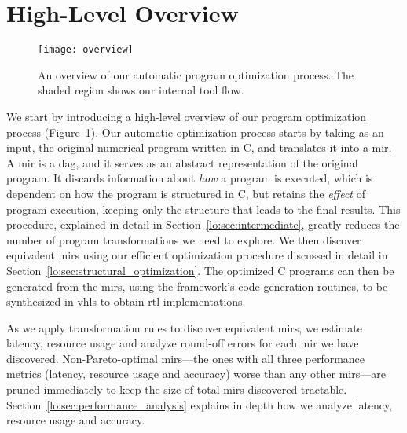 \section{High-Level Overview}
\label{lo:sec:overview}

\begin{figure}[ht]
    \centering
    \texttt{[image: overview]}
    \caption{%
        An overview of our automatic program optimization process. The shaded
        region shows our internal tool flow.
    }\label{lo:fig:overview}
\end{figure}

We start by introducing a high-level overview of our program optimization
process (Figure~\ref{lo:fig:overview}).  Our automatic optimization process
starts by taking as an input, the original numerical program written in C, and
translates it into a \gls{mir}\@.  A \gls{mir} is a \gls{dag}, and it serves as
an abstract representation of the original program.  It discards information
about \emph{how} a program is executed, which is dependent on how the program
is structured in C, but retains the \emph{effect} of program execution, keeping
only the structure that leads to the final results.  This procedure, explained
in detail in Section~\ref{lo:sec:intermediate}, greatly reduces the number
of program transformations we need to explore.  We then discover equivalent
\glspl{mir} using our efficient optimization procedure discussed in detail
in Section~\ref{lo:sec:structural_optimization}.  The optimized C programs
can then be generated from the \glspl{mir}, using the \soap{} framework's
code generation routines, to be synthesized in \gls{vhls} to obtain \gls{rtl}
implementations.

As we apply transformation rules to discover equivalent \glspl{mir}, we
estimate latency, resource usage and analyze round-off errors for each
\gls{mir} we have discovered.  Non-Pareto-optimal \glspl{mir}---the ones with
all three performance metrics (latency, resource usage and accuracy) worse
than any other \glspl{mir}---are pruned immediately to keep the size of total
\glspl{mir} discovered tractable.  Section~\ref{lo:sec:performance_analysis}
explains in depth how we analyze latency, resource usage and accuracy.
